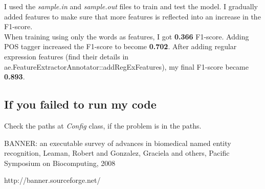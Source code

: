 \documentclass{article}
\begin{document}
I used the \textit{sample.in} and \textit{sample.out} files to train and test the model. I gradually added features to make sure that more features is reflected into an increase in the F1-score.\\

When training using only the words as features, I got \textbf{0.366} F1-score. Adding POS tagger increased the F1-score to become \textbf{0.702}. After adding regular expression features (find their details in ae.FeatureExtractorAnnotator::addRegExFeatures), my final F1-score became \textbf{0.893}.

\subsection{If you failed to run my code}
Check the paths at \textit{Config} class, if the problem is in the paths.

\begin{thebibliography}{9}


BANNER: an executable survey of advances in biomedical named entity recognition,
Leaman, Robert and Gonzalez, Graciela and others,
  Pacific Symposium on Biocomputing,
  2008

  http://banner.sourceforge.net/

\end{thebibliography}
\end{document}
